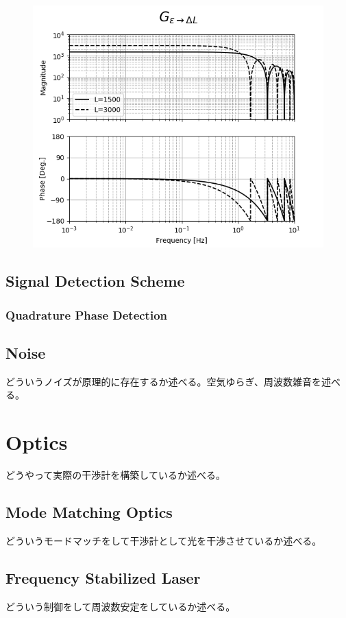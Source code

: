 \begin{figure}[h]
  \begin{center}
    \includegraphics[width=12.0cm]{./img_chap2/img212.png}
    \caption{}
  \end{center}
\end{figure}


\subsection{Signal Detection Scheme}
\subsubsection{Quadrature Phase Detection}


\subsection{Noise}
どういうノイズが原理的に存在するか述べる。空気ゆらぎ、周波数雑音を述べる。




\section{Optics} %
どうやって実際の干渉計を構築しているか述べる。
\subsection{Mode Matching Optics}
どういうモードマッチをして干渉計として光を干渉させているか述べる。
\subsection{Frequency Stabilized Laser}
どういう制御をして周波数安定をしているか述べる。
